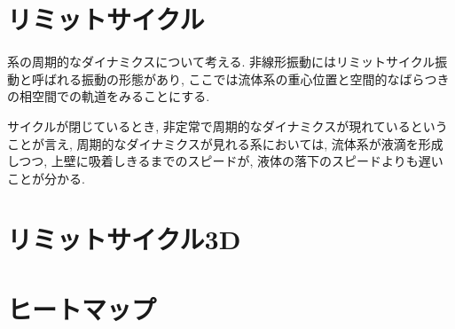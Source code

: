


\section{リミットサイクル}

系の周期的なダイナミクスについて考える. 非線形振動にはリミットサイクル振動\cite{Rhythm}と呼ばれる振動の形態があり, ここでは流体系の重心位置と空間的なばらつきの相空間での軌道をみることにする.

サイクルが閉じているとき, 非定常で周期的なダイナミクスが現れているということが言え, 周期的なダイナミクスが見れる系においては, 流体系が液滴を形成しつつ, 上壁に吸着しきるまでのスピードが, 液体の落下のスピードよりも遅いことが分かる.




\section{リミットサイクル3D}




\section{ヒートマップ}




